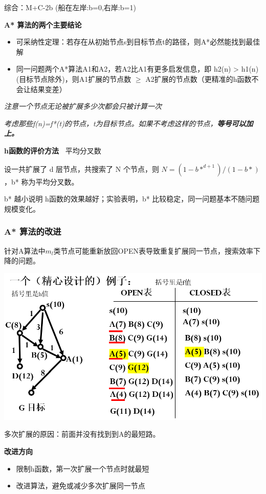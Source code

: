 \documentclass[b4paper, 10pt]{ctexart}
\makeatletter
\newenvironment{figurehere}
{\def\@captype{figure}}
{}
\makeatother
\begin{document}
\begin{multicols}{3}
综合：M+C-2b (船在左岸:b=0,右岸:b=1)

\textbf{A* 算法的两个主要结论}
\begin{itemize}
    \item 可采纳性定理：若存在从初始节点s到目标节点t的路径，则A*必然能找到最佳解
    \item 同一问题两个A*算法A1和A2，若A2比A1有更多启发信息，即 h2(n) > h1(n) (目标节点除外)，则A1扩展的节点数 $\ge$ A2扩展的节点数（更精准的h函数不会让结果变差）
\end{itemize}

\textit{注意一个节点无论被扩展多少次都会只被计算一次}

\textit{考虑那些f(n)=f*(t)的节点，t为目标节点。如果不考虑这样的节点，\textbf{等号可以加上。}}

\textbf{h函数的评价方法\ } 平均分叉数

设一共扩展了 d 层节点，共搜索了 N 个节点，则 $N=(1-b*^{d+1})/(1-b*)$，b* 称为平均分叉数。

b* 越小说明 h函数的效果越好；实验表明，b* 比较稳定，同一问题基本不随问题规模变化。

\subsubsection{A* 算法的改进}
针对A算法中$m_l$类节点可能重新放回OPEN表导致重复扩展同一节点，搜索效率下降的问题。

\begin{figurehere}
    \centering    \includegraphics[width=0.95\linewidth]{figs/A-algo-shortest-path.png}
    \label{fig:A-algo-sp}
\end{figurehere}

多次扩展的原因：前面并没有找到到A的最短路。

\textbf{改进方向}
\begin{itemize}
    \item 限制h函数，第一次扩展一个节点时就最短
    \item 改进算法，避免或减少多次扩展同一节点
\end{itemize}


\end{multicols}
\end{document}

